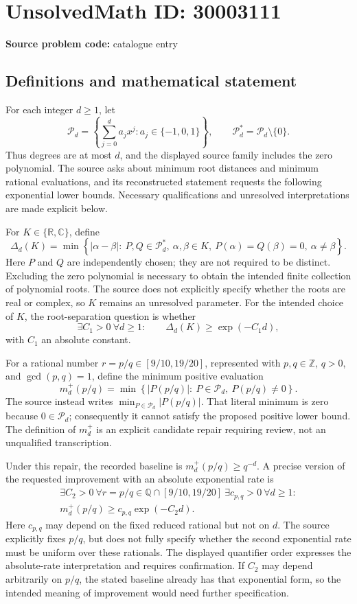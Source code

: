 \documentclass[11pt]{article}
\newcommand{\Z}{\mathbb{Z}}
\newcommand{\Q}{\mathbb{Q}}
\newcommand{\R}{\mathbb{R}}
\newcommand{\C}{\mathbb{C}}
\begin{document}
\section*{UnsolvedMath ID: 30003111}
\textbf{Source problem code:} catalogue entry
\subsection{Definitions and mathematical statement}
For each integer \(d\geq 1\), let
\[
\mathcal P_d=\left\{\sum_{j=0}^{d}a_jx^j:a_j\in\{-1,0,1\}\right\},
\qquad \mathcal P_d^*=\mathcal P_d\setminus\{0\}.
\]
Thus degrees are at most \(d\), and the displayed source family includes the zero polynomial. The source asks about minimum root distances and minimum rational evaluations, and its reconstructed statement requests the following exponential lower bounds. Necessary qualifications and unresolved interpretations are made explicit below.

For \(K\in\{\R,\C\}\), define
\[
\Delta_d(K)=\min\left\{|\alpha-\beta|:\ P,Q\in\mathcal P_d^*,\ \alpha,\beta\in K,\ P(\alpha)=Q(\beta)=0,\ \alpha\ne\beta\right\}.
\]
Here \(P\) and \(Q\) are independently chosen; they are not required to be distinct. Excluding the zero polynomial is necessary to obtain the intended finite collection of polynomial roots. The source does not explicitly specify whether the roots are real or complex, so \(K\) remains an unresolved parameter. For the intended choice of \(K\), the root-separation question is whether
\[
\exists C_1>0\ \forall d\geq1:\qquad
\Delta_d(K)\geq \exp(-C_1d),
\]
with \(C_1\) an absolute constant.

For a rational number \(r=p/q\in[9/10,19/20]\), represented with \(p,q\in\Z\), \(q>0\), and \(\gcd(p,q)=1\), define the minimum positive evaluation
\[
m_d^+(p/q)=\min\left\{|P(p/q)|:\ P\in\mathcal P_d,\ P(p/q)\ne0\right\}.
\]
The source instead writes \(\min_{P\in\mathcal P_d}|P(p/q)|\). That literal minimum is zero because \(0\in\mathcal P_d\); consequently it cannot satisfy the proposed positive lower bound. The definition of \(m_d^+\) is an explicit candidate repair requiring review, not an unqualified transcription.

Under this repair, the recorded baseline is \(m_d^+(p/q)\geq q^{-d}\). A precise version of the requested improvement with an absolute exponential rate is
\[
\begin{gathered}
\exists C_2>0\ \forall r=p/q\in\Q\cap[9/10,19/20]\
\exists c_{p,q}>0\ \forall d\geq1:\\
m_d^+(p/q)\geq c_{p,q}\exp(-C_2d).
\end{gathered}
\]
Here \(c_{p,q}\) may depend on the fixed reduced rational but not on \(d\). The source explicitly fixes \(p/q\), but does not fully specify whether the second exponential rate must be uniform over these rationals. The displayed quantifier order expresses the absolute-rate interpretation and requires confirmation. If \(C_2\) may depend arbitrarily on \(p/q\), the stated baseline already has that exponential form, so the intended meaning of improvement would need further specification.
\end{document}
